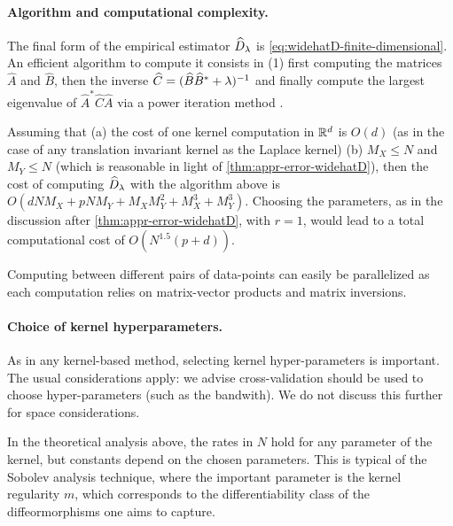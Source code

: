 
\paragraph{Algorithm and computational complexity.}
The final form of the empirical estimator $\widehat{D}_\lambda$ is \cref{eq:widehatD-finite-dimensional}. An efficient algorithm to compute it consists in (1) first computing the matrices $\widehat{A}$ and $\widehat{B}$, then the inverse $\widehat{C} = (\widehat{B}\widehat{B}^* + \lambda)^{-1}$ and finally compute the largest eigenvalue of $\widehat{A}^* \widehat{C} \widehat{A}$ via a power iteration method \cite{trefethen1997numerical}. %

Assuming that (a) the cost of one kernel computation in $\mathbb R^d$ is $O(d)$ (as in the case of any translation invariant kernel as the Laplace kernel) (b) $M_X \leq N$ and $M_Y \leq N$ (which is reasonable in light of \cref{thm:appr-error-widehatD}), then the cost of computing $\widehat{D}_\lambda$ with the algorithm above is
$O(d N M_X + p N M_Y + M_XM_Y^2 + M_X^3 + M_Y^3)$.
Choosing the parameters, as in the discussion after \cref{thm:appr-error-widehatD}, with $r = 1$, would lead to a total computational cost of
$O(N^{1.5}(p+d)).$

Computing \Diffy between different pairs of data-points can easily be parallelized as each computation relies on matrix-vector products and matrix inversions.

\paragraph{Choice of kernel hyperparameters.}
As in any kernel-based method, selecting kernel hyper-parameters is important. The usual considerations apply: we advise cross-validation should be used to choose hyper-parameters (such as the bandwith). We do not discuss this further for space considerations.

In the theoretical analysis above, the rates in $N$ hold for any parameter of the kernel, but constants depend on the chosen parameters. This is typical of the Sobolev analysis technique, where the important parameter is the kernel regularity $m$, which corresponds to the differentiability class of the diffeormorphisms one aims to capture.

